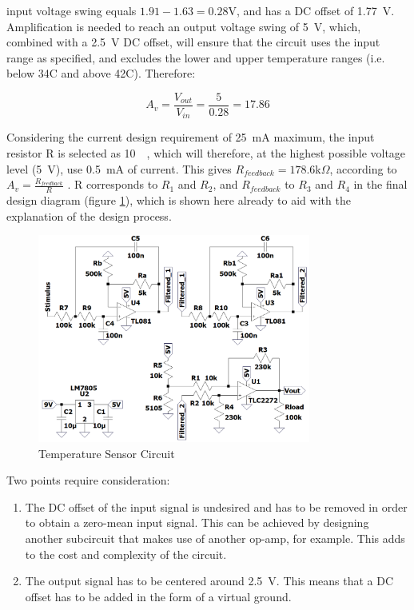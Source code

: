input voltage swing equals $1.91 - 1.63 = 0.28$V, and has a DC offset of \SI{1.77}{\volt}. Amplification is needed to reach an output voltage swing of \SI{5}{\volt}, which, combined with a \SI{2.5}{V} DC offset, will ensure that the circuit uses the input range as specified, and excludes the lower and upper temperature ranges (i.e. below 34\degree C and above 42\degree C). Therefore:

$$A_v = \frac{V_{out}}{V_{in}} = \frac{5}{0.28} = 17.86$$

Considering the current design requirement of \SI{25}{mA} maximum, the input resistor R is selected as \SI{10}{\kilo \Omega}, which will therefore, at the highest possible voltage level (\SI{5}{\volt}), use \SI{0.5}{mA} of current.  This gives $R_{feedback} = 178.6$k$\Omega$, according to $A_v = \frac{{R}_{feedback}}{R}$ \cite{opamp}. R corresponds to $R_1$ and $R_2$, and $R_{feedback}$ to $R_{3}$ and $R_4$ in the final design diagram (figure \ref{fig:final}), which is shown here already to aid with the explanation of the design process. 

\begin{figure}[H]
    \centering
    \includegraphics[width = 0.8\textwidth]{Figures/final.png}
    \caption{Temperature Sensor Circuit}
    \label{fig:final}
\end{figure}

Two points require consideration: 
\begin{enumerate}
\item The DC offset of the input signal is undesired and has to be removed in order to obtain a zero-mean input signal. This can be achieved by designing another subcircuit that makes use of another op-amp, for example. This adds to the cost and complexity of the circuit.
\item The output signal has to be centered around \SI{2.5}{\volt}. This means that a DC offset has to be added in the form of a virtual ground.
\end{enumerate}

